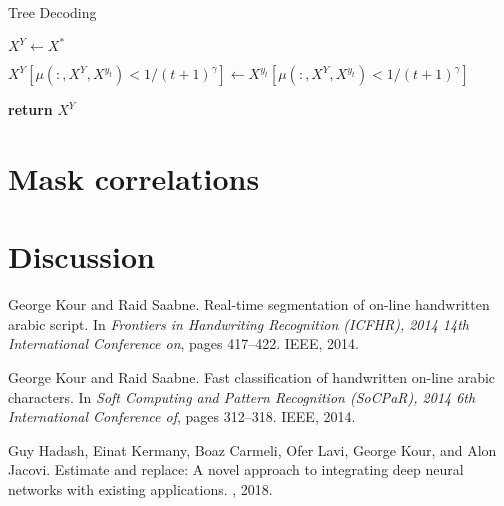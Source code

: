 \documentclass{article}
\begin{document}
\begin{algorithm}
\caption{Tree Decoding}

\begin{algorithmic}[0]
\State $X^Y \gets X^*$


\State $X^Y[\mu(:, X^Y, X^{y_t}) < 1/(t+1)^\gamma] \gets X^{y_t}[\mu(:, X^Y, X^{y_t}) < 1/(t+1)^\gamma]$

\EndFor

\State \textbf{return} $X^Y$
\EndFunction

\end{algorithmic}
\end{algorithm}

\section{Mask correlations}

\section{Discussion}




  


\begin{thebibliography}{1}

George Kour and Raid Saabne.
\newblock Real-time segmentation of on-line handwritten arabic script.
\newblock In {\em Frontiers in Handwriting Recognition (ICFHR), 2014 14th
  International Conference on}, pages 417--422. IEEE, 2014.

George Kour and Raid Saabne.
\newblock Fast classification of handwritten on-line arabic characters.
\newblock In {\em Soft Computing and Pattern Recognition (SoCPaR), 2014 6th
  International Conference of}, pages 312--318. IEEE, 2014.

Guy Hadash, Einat Kermany, Boaz Carmeli, Ofer Lavi, George Kour, and Alon
  Jacovi.
\newblock Estimate and replace: A novel approach to integrating deep neural
  networks with existing applications.
, 2018.

\end{thebibliography}
\end{document}
